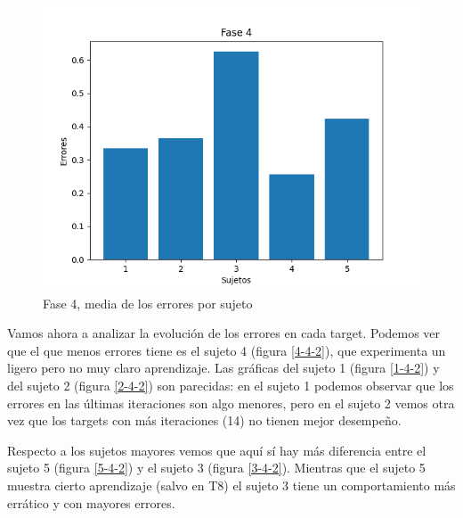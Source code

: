 \documentclass[a4paper,11pt, oneside]{book}
\begin{document}
\begin{figure}[H]
	\includegraphics[width=\linewidth]{fase4-errores}
	\caption{Fase 4, media de los errores por sujeto}
	\label{fase4-errores}
\end{figure}



Vamos ahora a analizar la evolución de los errores en cada target. Podemos ver que el que menos errores tiene es el sujeto 4 (figura \ref{4-4-2}), que experimenta un ligero pero no muy claro aprendizaje. Las gráficas del sujeto 1  (figura \ref{1-4-2}) y del sujeto 2 (figura \ref{2-4-2}) son parecidas: en el sujeto 1 podemos observar que los errores en las últimas iteraciones son algo menores, pero en el sujeto 2 vemos otra vez que los targets con más iteraciones (14) no tienen mejor desempeño. 

Respecto a los sujetos mayores vemos que aquí sí hay más diferencia entre el sujeto 5 (figura \ref{5-4-2}) y el sujeto 3 (figura \ref{3-4-2}). Mientras que el sujeto 5 muestra cierto aprendizaje (salvo en T8) el sujeto 3 tiene un comportamiento más errático y con mayores errores.
\end{document}
